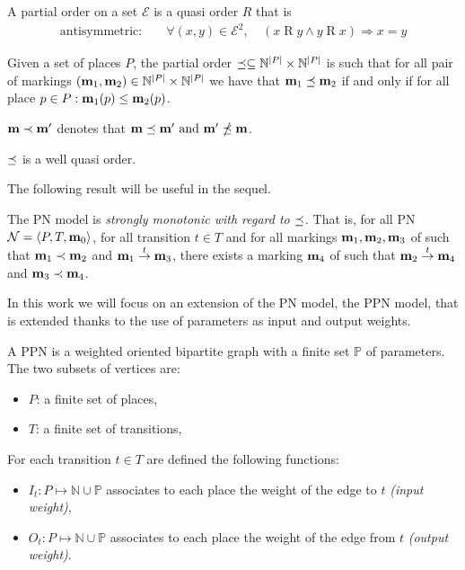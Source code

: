 \begin{defi}
  A partial order on a set $\mathcal{E}$ is a quasi order $R$ that is
  \begin{align*}
    \text{antisymmetric: } &&\forall (x, y) \in \mathcal{E}^2,\ & (x \mathrel{R} y\land y \mathrel{R} x)\Rightarrow x = y
  \end{align*}
\end{defi}

\begin{defi}
  Given a set of places $P$, the partial order \(\preceq \subseteq \mathbb{N}^{|P|} \times \mathbb{N}^{|P|}\) is such that for all pair of markings \((\mathbf{m}_1, \mathbf{m}_2) \in \mathbb{N}^{|P|} \times \mathbb{N}^{|P|}\) we have that \(\mathbf{m}_1 \preceq \mathbf{m}_2\) if and only if for all place \(p \in P : \mathbf{m}_1(p) \leq \mathbf{m}_2(p)\).
\end{defi}

\(\mathbf{m} \prec \mathbf{m'}\) denotes that \(\mathbf{m} \preceq \mathbf{m'} \text{ and } \mathbf{m'} \npreceq \mathbf{m}\).

\begin{lemm}
  \label{lemm:wqo}
  $\preceq$ is a well quasi order.
\end{lemm}

The following result will be useful in the sequel.

\begin{lemm}
  The \ac{PN} model is \emph{strongly monotonic with regard to $\preceq$}. That is, for all \ac{PN} $\mathcal{N} = \langle P,T, \mathbf{m}_0\rangle$, for all transition $t \in T$ and for all markings $\mathbf{m}_1, \mathbf{m}_2, \mathbf{m}_3$ of \tupleN such that $\mathbf{m}_1 \prec \mathbf{m}_2$ and $\mathbf{m}_1 \stackrel{t}{\to} \mathbf{m}_3$, there exists a marking $\mathbf{m}_4$ of \tupleN such that $\mathbf{m}_2 \stackrel{t}{\to} \mathbf{m}_4$ and $\mathbf{m}_3 \prec \mathbf{m}_4$. 
\end{lemm}

In this work we will focus on an extension of the \ac{PN} model, the \ac{PPN} model, that is extended thanks to the use of parameters as input and output weights.

\begin{defi}
  A \acf{PPN} \SPTP is a weighted oriented bipartite graph with a finite set $\mathbb{P}$ of parameters. The two subsets of vertices are:
  \begin{itemize}
    \item $P$: a finite set of places,
    \item $T$: a finite set of transitions,
  \end{itemize}
  For each transition $t \in T$ are defined the following functions:
  \begin{itemize}
    \item $I_t : P \mapsto \mathbb{N} \cup \mathbb{P}$ associates to each place the weight of the edge to $t$ \emph{(input weight)},
    \item $O_t : P \mapsto \mathbb{N} \cup \mathbb{P}$ associates to each place the weight of the edge from $t$ \emph{(output weight)}.
  \end{itemize}
\end{defi}

